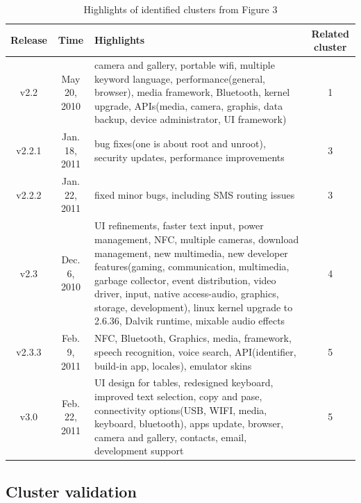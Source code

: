 \documentclass[10pt, conference, compsocconf]{IEEEtran}
\begin{document}
\begin{table}[!t]
\caption{Highlights of identified clusters from Figure 3}
\label{release}
\centering
\begin{tabular}{|c|c|p{9.5cm}|c|}
\hline
Release & Time & Highlights & Related cluster\\
\hline
v2.2 & May 20, 2010 & camera and gallery, portable wifi, multiple keyword language, performance(general, browser), media framework, Bluetooth, kernel upgrade, APIs(media, camera, graphis, data backup, device administrator, UI framework) & 1 \\
\hline
v2.2.1 & Jan. 18, 2011 & bug fixes(one is about root and unroot), security updates, performance improvements & 3\\
\hline
v2.2.2 & Jan. 22, 2011 & fixed minor bugs, including SMS routing issues & 3\\
\hline
v2.3 & Dec. 6, 2010 & UI refinements, faster text input, power management, NFC, multiple cameras, download management, new multimedia, new developer features(gaming, communication, multimedia, garbage collector, event distribution, video driver, input, native access-audio, graphics, storage, development), linux kernel upgrade to 2.6.36, Dalvik runtime, mixable audio effects & 4\\
\hline
v2.3.3 & Feb. 9, 2011 & NFC, Bluetooth, Graphics, media, framework, speech recognition, voice search, API(identifier, build-in app, locales), emulator skins & 5 \\
\hline
v3.0 & Feb. 22, 2011 & UI design for tables, redesigned keyboard, improved text selection, copy and pase, connectivity options(USB, WIFI, media, keyboard, bluetooth), apps update, browser, camera and gallery, contacts, email, development support & 5 \\
\hline
\end{tabular}
\end{table}



\subsection{Cluster validation}
\end{document}
